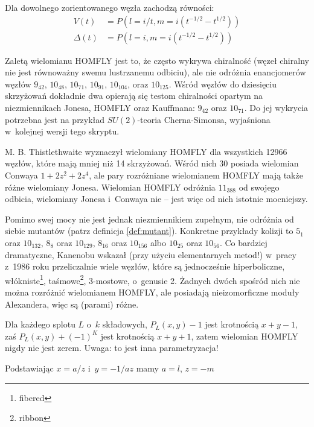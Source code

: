 \begin{proposition}
    Dla dowolnego zorientowanego węzła zachodzą równości:
    \begin{align*}
        V(t) & = P(l = i/t, m = i(t^{-1/2} - t^{1/2})) \\
        \Delta(t) & = P(l = i, m = i(t^{-1/2} - t^{1/2}))
    \end{align*}
\end{proposition}

Zaletą wielomianu HOMFLY jest to, że często wykrywa chiralność (węzeł chiralny nie jest równoważny swemu lustrzanemu odbiciu), ale nie odróżnia enancjomerów węzłów $9_{42}$, $10_{48}$, $10_{71}$, $10_{91}$, $10_{104}$, oraz $10_{125}$.
Wśród węzłów do dziesięciu skrzyżowań dokładnie dwa opierają się testom chiralności opartym na niezmiennikach Jonesa, HOMFLY oraz Kauffmana: $9_{42}$ oraz $10_{71}$.
Do jej wykrycia potrzebna jest na przykład $SU(2)$-teoria Cherna-Simonsa, wyjaśniona w~kolejnej wersji tego skryptu.

M. B. Thistlethwaite wyznaczył wielomiany HOMFLY dla wszystkich 12966 węzłów, które mają mniej niż 14 skrzyżowań.
Wśród nich 30 posiada wielomian Conwaya $1 + 2z^2 + 2z^4$, ale pary rozróżniane wielomianem HOMFLY mają także różne wielomiany Jonesa.
Wielomian HOMFLY odróżnia $11_{388}$ od swojego odbicia, wielomiany Jonesa i~Conwaya nie -- jest więc od nich istotnie mocniejszy.

Pomimo swej mocy nie jest jednak niezmiennikiem zupełnym, nie odróżnia od siebie mutantów (patrz definicja \ref{def:mutant}).
Konkretne przykłady kolizji to $5_1$ oraz $10_{132}$, $8_{8}$ oraz $10_{129}$, $8_{16}$ oraz $10_{156}$ albo $10_{25}$ oraz $10_{56}$.
Co bardziej dramatyczne, Kanenobu wskazał (przy użyciu elementarnych metod!) w~pracy \cite{kanenobu86} z~1986 roku przeliczalnie wiele węzłów, które są jednocześnie hiperboliczne, włókniste\footnote{fibered}, taśmowe\footnote{ribbon}, 3-mostowe, o~genusie 2.
Żadnych dwóch spośród nich nie można rozróżnić wielomianem HOMFLY, ale posiadają nieizomorficzne moduły Alexandera, więc są (parami) różne.


Dla każdego splotu $L$ o~$k$ składowych, $P_L(x,y) - 1$ jest krotnością $x+y-1$, zaś $P_L(x,y) + (-1)^K$ jest krotnością $x +y + 1$, zatem wielomian HOMFLY nigdy nie jest zerem.
Uwaga: to jest inna parametryzacja!

Podstawiając $x = a/z$ i~$y = -1/az$ mamy $a = l$, $z = -m$
